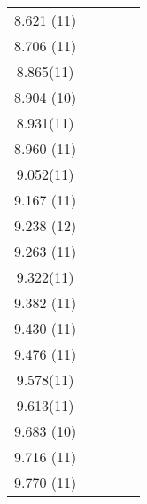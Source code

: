 \begin{center}
\begin{longtable}{cc cc c}
  8.621 (11)           &          &             &                               &               \\
  8.706 (11)           &          &             &                               &               \\
   8.865(11)           &          &             &                               &               \\
  8.904 (10)           &          &             &                               &               \\
   8.931(11)           &          &             &                               &               \\ 
  8.960 (11)           &          &             &                               &               \\
   9.052(11)           &          &             &                               &               \\
  9.167 (11)           &          &             &                               &               \\
  9.238 (12)           &          &             &                               &               \\
  9.263 (11)           &          &             &                               &               \\
   9.322(11)           &          &             &                               &               \\
  9.382 (11)           &          &             &                               &               \\
  9.430 (11)           &          &             &                               &               \\
  9.476 (11)           &          &             &                               &               \\
   9.578(11)           &          &             &                               &               \\
   9.613(11)           &          &             &                               &               \\
  9.683 (10)           &          &             &                               &               \\
  9.716 (11)           &          &             &                               &               \\
  9.770 (11)           &          &             &                               &               \\

\end{longtable}
\end{center}
